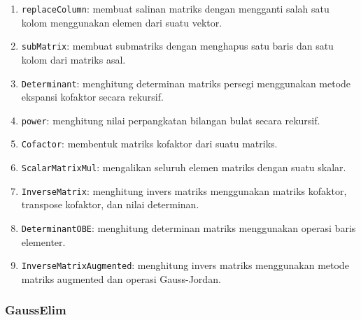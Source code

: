 \documentclass{article}
\begin{document}
\begin{enumerate}
    \item{\texttt{replaceColumn}: membuat salinan matriks dengan mengganti salah satu kolom menggunakan elemen dari suatu vektor.}

    \item{\texttt{subMatrix}: membuat submatriks dengan menghapus satu baris dan satu kolom dari matriks asal.}

    \item{\texttt{Determinant}: menghitung determinan matriks persegi menggunakan metode ekspansi kofaktor secara rekursif.}

    \item{\texttt{power}: menghitung nilai perpangkatan bilangan bulat secara rekursif.}

    \item{\texttt{Cofactor}: membentuk matriks kofaktor dari suatu matriks.}

    \item{\texttt{ScalarMatrixMul}: mengalikan seluruh elemen matriks dengan suatu skalar.}

    \item{\texttt{InverseMatrix}: menghitung invers matriks menggunakan matriks kofaktor, transpose kofaktor, dan nilai determinan.}

    \item{\texttt{DeterminantOBE}: menghitung determinan matriks menggunakan operasi baris elementer.}

    \item{\texttt{InverseMatrixAugmented}: menghitung invers matriks menggunakan metode matriks augmented dan operasi Gauss-Jordan.}

\end{enumerate}


\subsubsection{GaussElim}

\end{document}
